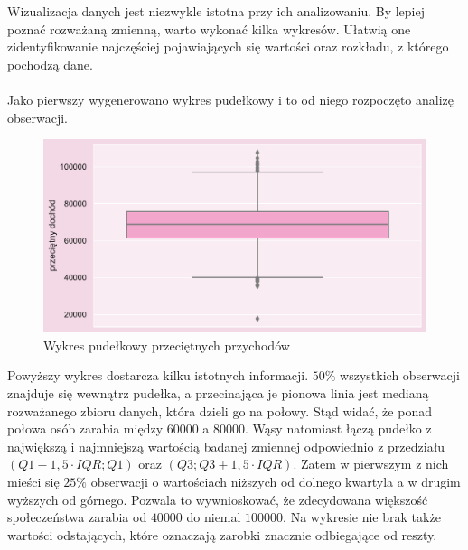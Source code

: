 \documentclass{article}
\begin{document}
Wizualizacja danych jest niezwykle istotna przy ich analizowaniu. By lepiej poznać rozważaną zmienną, warto wykonać kilka wykresów. Ułatwią one zidentyfikowanie najczęściej pojawiających się wartości oraz rozkładu, z którego pochodzą dane.\\\\
Jako pierwszy wygenerowano wykres pudełkowy i to od niego rozpoczęto analizę obserwacji.
    \begin{figure}[H]
	\begin{center}
		\includegraphics[scale=0.68]{images/income_box.pdf}
		\caption{Wykres pudełkowy przeciętnych przychodów}
		\label{fig:income_box}
	\end{center}
	\end{figure}
\noindent Powyższy wykres dostarcza kilku istotnych informacji. $50\%$ wszystkich obserwacji znajduje się wewnątrz pudełka, a przecinająca je pionowa linia jest medianą rozważanego zbioru danych, która dzieli go na połowy. Stąd widać, że ponad połowa osób zarabia między $60 000$ a $80 000$. Wąsy natomiast łączą pudełko z największą i najmniejszą wartością badanej zmiennej odpowiednio z przedziału $(Q1 - 1,5 \cdot IQR; Q1)$ oraz $(Q3;Q3 + 1,5 \cdot IQR)$. Zatem w pierwszym z nich mieści się $25\%$ obserwacji o wartościach niższych od dolnego kwartyla a w drugim wyższych od górnego. Pozwala to wywnioskować, że zdecydowana większość społeczeństwa zarabia od $40 000$ do niemal $100000$. Na wykresie nie brak także wartości odstających, które oznaczają zarobki znacznie odbiegające od reszty. 
\end{document}
